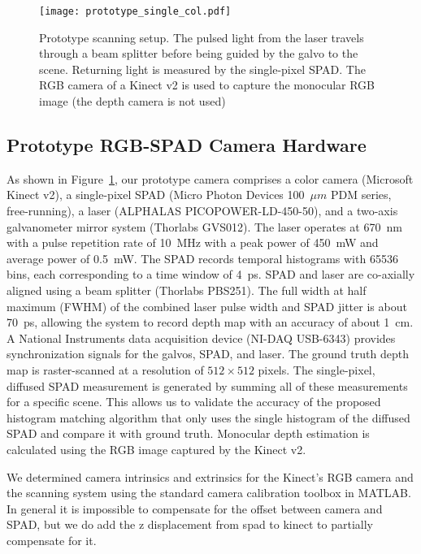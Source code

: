 \begin{figure}[H]
  \texttt{[image: prototype\_single\_col.pdf]}
  \caption{Prototype scanning setup. The pulsed light from the laser travels
    through a beam splitter before being guided by the galvo to the scene.
    Returning light is measured by the single-pixel SPAD. The RGB camera of a
    Kinect v2 is used to capture the monocular RGB image (the depth camera is
    not used)}
  \label{fig:prototype}
\end{figure}

\subsection{Prototype RGB-SPAD Camera Hardware}


As shown in Figure~\ref{fig:prototype}, our prototype camera comprises a color camera (Microsoft Kinect v2), a single-pixel SPAD (Micro Photon Devices 100~$\mu m$ PDM series, free-running), a laser (ALPHALAS PICOPOWER-LD-450-50), and a two-axis galvanometer mirror system (Thorlabs GVS012). The laser operates at 670~nm with a pulse repetition rate of 10~MHz with a peak power of 450~mW and average power of 0.5~mW. The SPAD records temporal histograms with 65536 bins, each corresponding to a time window of 4~ps. SPAD and laser are co-axially aligned using a beam splitter (Thorlabs PBS251). The full width at half maximum (FWHM) of the combined laser pulse width and SPAD jitter is about 70~ps, allowing the system to record depth map with an accuracy of about 1~cm. A National Instruments data acquisition device (NI-DAQ USB-6343) provides synchronization signals for the galvos, SPAD, and laser. The ground truth depth map is raster-scanned at a resolution of $512 \times 512$ pixels. The single-pixel, diffused SPAD measurement is generated by summing all of these measurements for a specific scene. This allows us to validate the accuracy of the proposed histogram matching algorithm that only uses the single histogram of the diffused SPAD and compare it with ground truth. Monocular depth estimation is calculated using the RGB image captured by the Kinect v2.

We determined camera intrinsics and extrinsics for the Kinect's RGB camera and
the scanning system using the standard camera calibration toolbox in MATLAB.
In general it is impossible to compensate for the offset between camera and
SPAD, but we do add the z displacement from spad to kinect to partially
compensate for it.

